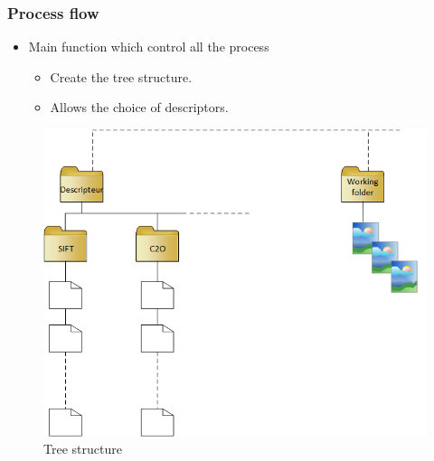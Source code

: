 \documentclass[xcolor=table]{beamer}
\begin{document}
\begin{frame} \frametitle{Process flow}

\begin{itemize}
    \item Main function which control all the process
    \begin{itemize}
        \item Create the tree structure.
        \item Allows the choice of descriptors.
    \end{itemize}
\end{itemize}

\begin{figure}[h]
        \centering
        \includegraphics[scale=0.25]{arborescence.png}
        \caption{Tree structure}
        \label{fig:img_arbo}
    \end{figure}


\end{frame}
\end{document}

